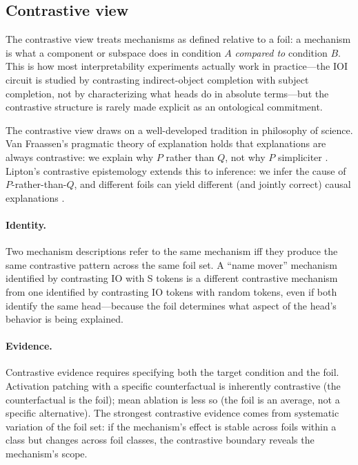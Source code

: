 \documentclass{article}
\begin{document}
\subsection{Contrastive view}

The contrastive view treats mechanisms as defined relative to a foil:
a mechanism is what a component or subspace does in condition $A$
\emph{compared to} condition $B$.  This is how most interpretability
experiments actually work in practice---the IOI circuit is studied by
contrasting indirect-object completion with subject completion, not by
characterizing what heads do in absolute terms---but the contrastive
structure is rarely made explicit as an ontological commitment.

The contrastive view draws on a well-developed tradition in philosophy
of science.  Van Fraassen's pragmatic theory of explanation holds that
explanations are always contrastive: we explain why $P$ rather than $Q$,
not why $P$ simpliciter \citep{vanfraassen1980}.  Lipton's contrastive
epistemology extends this to inference: we infer the cause of $P$-rather-than-$Q$,
and different foils can yield different (and jointly correct) causal
explanations \citep{lipton1990}.

\paragraph{Identity.}
Two mechanism descriptions refer to the same mechanism iff they produce
the same contrastive pattern across the same foil set.  A ``name mover''
mechanism identified by contrasting IO with S tokens is a different
contrastive mechanism from one identified by contrasting IO tokens with
random tokens, even if both identify the same head---because the foil
determines what aspect of the head's behavior is being explained.

\paragraph{Evidence.}
Contrastive evidence requires specifying both the target condition and
the foil.  Activation patching with a specific counterfactual is
inherently contrastive (the counterfactual is the foil); mean ablation
is less so (the foil is an average, not a specific alternative).  The
strongest contrastive evidence comes from systematic variation of the
foil set: if the mechanism's effect is stable across foils within a
class but changes across foil classes, the contrastive boundary reveals
the mechanism's scope.
\end{document}
